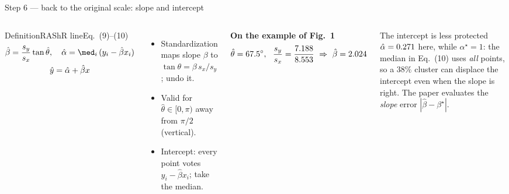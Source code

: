 \documentclass[aspectratio=169,9pt]{beamer}
\begin{document}
\begin{frame}{Step 6 --- back to the original scale: slope and intercept}
\begin{columns}[T]
\begin{rdef}{Definition}{RAShR line}{Eq.~(9)--(10)}
\[\begin{gathered}\hat\beta=\frac{s_y}{s_x}\tan\hat\theta,\quad \hat\alpha=\med_i\,(y_i-\hat\beta x_i)\\ \hat y=\hat\alpha+\hat\beta x\end{gathered}\]
\end{rdef}
\begin{itemize}\setlength\itemsep{2pt}\small
\item Standardization maps slope $\beta$ to $\tan\theta=\beta\,s_x/s_y$; undo it.
\item Valid for $\hat\theta\in[0,\pi)$ away from $\pi/2$ (vertical).
\item Intercept: every point votes $y_i-\hat\beta x_i$; take the median.
\end{itemize}
\textbf{On the example of Fig.~1}
\[\hat\theta=\thetahat^\circ,\ \ \frac{s_y}{s_x}=\frac{\syval}{\sxval}\ \Rightarrow\ \hat\beta=\betahat\]
\begin{rwarn}{The intercept is less protected}
$\hat\alpha=0.271$ here, while $\alpha^\star=1$: the median in Eq.~(10) uses \emph{all} points, so a $38\%$ cluster can displace the intercept even when the slope is right. The paper evaluates the \emph{slope} error $|\hat\beta-\beta^\star|$.
\end{rwarn}
\end{columns}
\end{frame}
\end{document}
